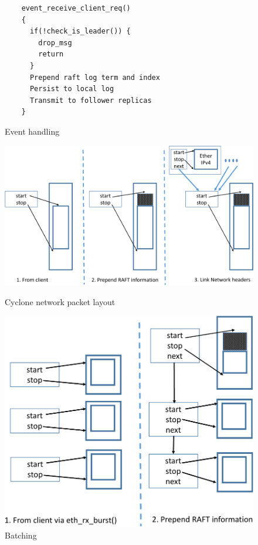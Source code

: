 \documentclass[pageno]{jpaper}
\begin{document}
\begin{figure}
  \begin{minipage}{.2\textwidth}
    \scriptsize
\begin{verbatim}
    event_receive_client_req()
    {
      if(!check_is_leader()) {
        drop_msg
        return
      }
      Prepend raft log term and index
      Persist to local log
      Transmit to follower replicas
    }
\end{verbatim}
\caption{Event handling}
\label{fig:control_plane}
\end{minipage}
\begin{minipage}{.5\textwidth}
  \centering
  \includegraphics[scale=0.3]{figures2/network_packet.pdf}
  \caption{Cyclone network packet layout}
  \label{fig:packet_layout}
\end{minipage}
\begin{minipage}{.3\textwidth}
  \centering
  \includegraphics[scale=0.3]{figures2/batching.pdf}
  \caption{Batching}
  \label{fig:batching}
\end{minipage}
\end{figure}
\end{document}
